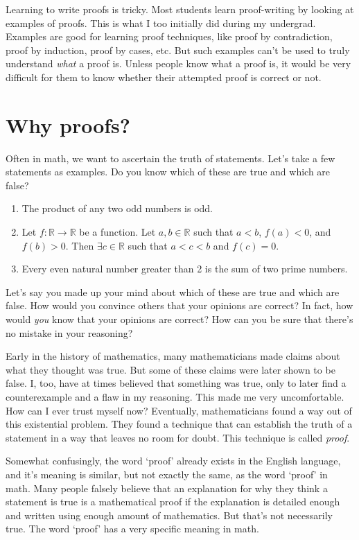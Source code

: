 Learning to write proofs is tricky.
Most students learn proof-writing by looking at examples of proofs.
This is what I too initially did during my undergrad.
Examples are good for learning proof techniques, like proof by contradiction,
proof by induction, proof by cases, etc.
But such examples can't be used to truly understand \emph{what} a proof is.
Unless people know what a proof is, it would be very difficult for them to know
whether their attempted proof is correct or not.

\section{Why proofs?}

Often in math, we want to ascertain the truth of statements.
Let's take a few statements as examples.
Do you know which of these are true and which are false?
\begin{enumerate}
\item The product of any two odd numbers is odd.
\item Let $f: \mathbb{R} \to \mathbb{R}$ be a function. Let $a, b \in \mathbb{R}$ such that
    $a < b$, $f(a) < 0$, and $f(b) > 0$. Then $\exists c \in \mathbb{R}$ such that
    $a < c < b$ and $f(c) = 0$.
\item Every even natural number greater than 2 is the sum of two prime numbers.
\end{enumerate}

Let's say you made up your mind about which of these are true and which are false.
How would you convince others that your opinions are correct?
In fact, how would \emph{you} know that your opinions are correct?
How can you be sure that there's no mistake in your reasoning?

Early in the history of mathematics, many mathematicians made claims about what they thought was true.
But some of these claims were later shown to be false.
I, too, have at times believed that something was true, only to later find a counterexample
and a flaw in my reasoning. This made me very uncomfortable. How can I ever trust myself now?
Eventually, mathematicians found a way out of this existential problem.
They found a technique that can establish the truth of a statement
in a way that leaves no room for doubt. This technique is called \emph{proof}.

Somewhat confusingly, the word `proof' already exists in the English language,
and it's meaning is similar, but not exactly the same, as the word `proof' in math.
Many people falsely believe that an explanation for why they think a statement is true
is a mathematical proof if the explanation is detailed enough and
written using enough amount of mathematics. But that's not necessarily true.
The word `proof' has a very specific meaning in math.

